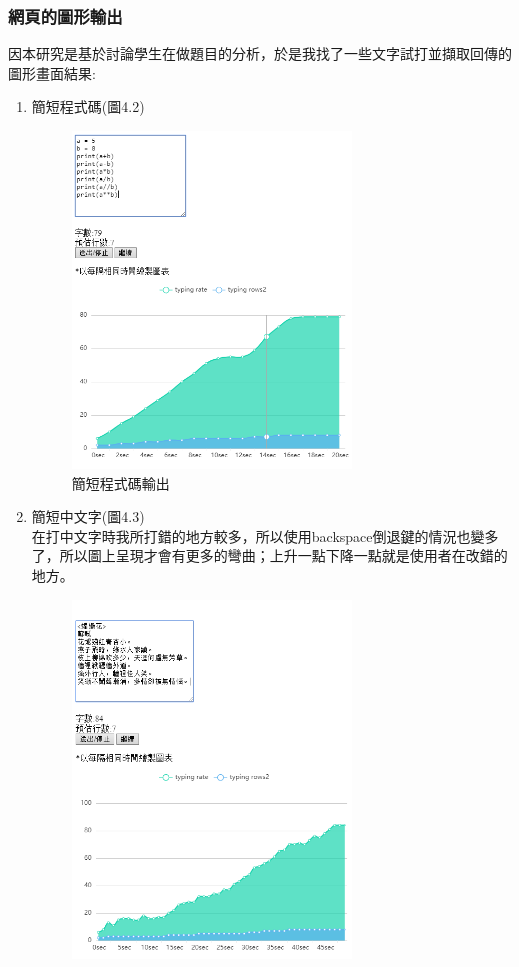 \subsubsection{網頁的圖形輸出}
因本研究是基於討論學生在做題目的分析，於是我找了一些文字試打並擷取回傳的圖形畫面結果:
\begin{enumerate}[1.]
	\item 簡短程式碼(圖4.2)
	\begin{figure}[H] 
		\centering 
		\includegraphics[width=0.7\textwidth]{4_2.png} 
		\caption{簡短程式碼輸出} 
		\label{Fig.4.2} 
	\end{figure}
	\item 簡短中文字(圖4.3)\\
	在打中文字時我所打錯的地方較多，所以使用backspace倒退鍵的情況也變多了，所以圖上呈現才會有更多的彎曲；上升一點下降一點就是使用者在改錯的地方。
	\begin{figure}[H] 
		\centering 
		\includegraphics[width=0.7\textwidth]{4_3.png} 

\end{figure}
\end{enumerate}
